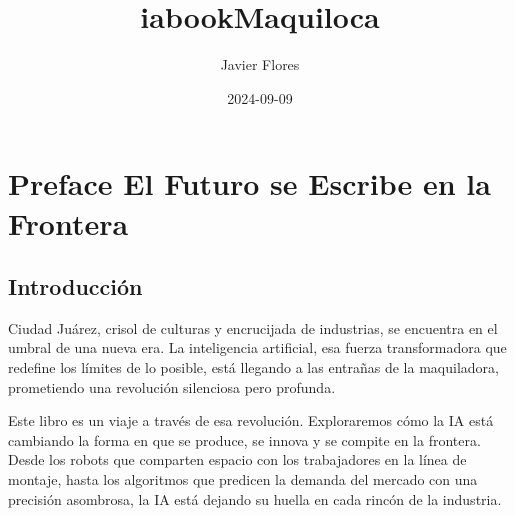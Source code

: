 \documentclass[
  10pt,
  letterpaper,
]{book}
\title{iabookMaquiloca}
\author{Javier Flores}
\date{2024-09-09}
\renewcommand*\contentsname{Table of contents}
\newcommand\contentsname{Table of contents}
\begin{document}
\frontmatter
\maketitle

\pretitle{\begin{center}\Huge\sffamily\bfseries}
\posttitle{\end{center}}
\preauthor{\begin{center}\large\sffamily}
\postauthor{\end{center}}
\predate{\begin{center}\large}
\postdate{\end{center}\vspace{2cm}}
\maketitle

\renewcommand*\contentsname{Table of contents}
{
\hypersetup{linkcolor=}
\setcounter{tocdepth}{1}
\tableofcontents
}

\mainmatter
{}

\chapter*{Preface El Futuro se Escribe en la
Frontera}\label{preface-el-futuro-se-escribe-en-la-frontera}


\section*{Introducción}\label{introducciuxf3n}


Ciudad Juárez, crisol de culturas y encrucijada de industrias, se
encuentra en el umbral de una nueva era. La inteligencia artificial, esa
fuerza transformadora que redefine los límites de lo posible, está
llegando a las entrañas de la maquiladora, prometiendo una revolución
silenciosa pero profunda.

Este libro es un viaje a través de esa revolución. Exploraremos cómo la
IA está cambiando la forma en que se produce, se innova y se compite en
la frontera. Desde los robots que comparten espacio con los trabajadores
en la línea de montaje, hasta los algoritmos que predicen la demanda del
mercado con una precisión asombrosa, la IA está dejando su huella en
cada rincón de la industria.
\end{document}
